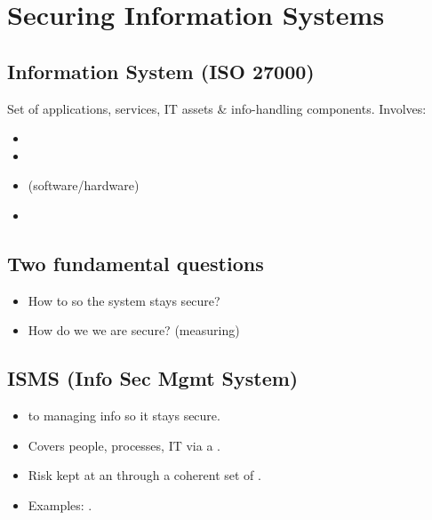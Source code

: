 

\section{Securing Information Systems}

\subsection{Information System (ISO 27000)}
Set of applications, services, IT assets \& info-handling components. Involves:
\begin{itemize}
\item {}
\item {}
\item {} (software/hardware)
\item {}
\end{itemize}

\subsection{Two fundamental questions}
\begin{itemize}
\item How to  so the system stays secure?
\item How do we  we are secure? (measuring)
\end{itemize}

\subsection{ISMS (Info Sec Mgmt System)}
\begin{itemize}
\item {} to managing info so it stays secure.
\item Covers people, processes, IT via a .
\item Risk kept at an  through a coherent set of .
\item Examples: .
\end{itemize}

